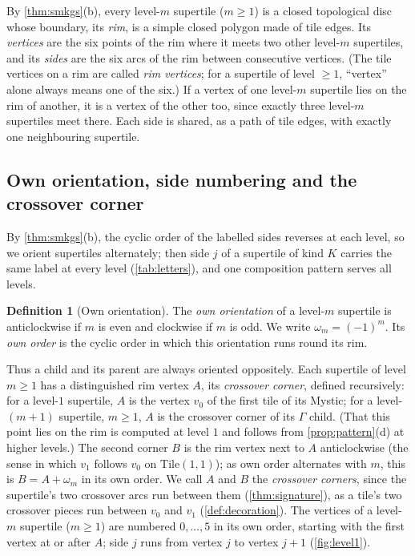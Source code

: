 \documentclass[11pt]{amsart}
\theoremstyle{definition}
\newtheorem{definition}[theorem]{Definition}
\theoremstyle{remark}
\newcommand{\Tile}{\mathrm{Tile}(1,1)}
\begin{document}
By \cref{thm:smkgs}(b), every level-$m$ supertile ($m\ge1$) is a closed topological disc whose boundary, its \emph{rim}, is a
simple closed polygon made of tile edges. Its \emph{vertices} are the six points of the rim where it meets two other
level-$m$ supertiles, and its \emph{sides} are the six arcs of the rim between consecutive vertices. (The tile
vertices on a rim are called \emph{rim vertices}; for a supertile of level $\ge1$, ``vertex'' alone always means one of
the six.) If a vertex of one level-$m$ supertile lies on the rim of another, it is a vertex of the other too, since
exactly three level-$m$ supertiles meet there. Each side is shared, as a path of tile edges, with exactly one
neighbouring supertile.

\subsection{Own orientation, side numbering and the crossover corner}\label{sec:own}
By \cref{thm:smkgs}(b), the cyclic order of the labelled sides reverses at each level, so we orient supertiles
alternately; then side $j$ of a supertile of kind $K$ carries the same label at every level (\cref{tab:letters}), and
one composition pattern serves all levels.

\begin{definition}[Own orientation]\label{def:own}
The \emph{own orientation} of a level-$m$ supertile is anticlockwise if $m$ is even and clockwise if $m$ is odd.
We write $\omega_m=(-1)^m$. Its \emph{own order} is the cyclic order in which this orientation runs round its rim.
\end{definition}

Thus a child and its parent are always oriented oppositely. Each supertile of level $m\ge1$ has a distinguished rim
vertex $A$, its \emph{crossover corner}, defined recursively: for a level-$1$ supertile, $A$ is the vertex $v_0$ of the
first tile of its Mystic; for a level-$(m+1)$ supertile, $m\ge1$, $A$ is the crossover corner of its $\Gamma$ child.
(That this point lies on the rim is computed at level $1$ and follows from \cref{prop:pattern}(d) at higher levels.)
The second corner $B$ is the rim vertex next to $A$ anticlockwise (the sense in which $v_1$ follows $v_0$ on
$\Tile$); as own order alternates with $m$, this is $B=A+\omega_m$ in its own order. We call $A$ and $B$ the
\emph{crossover corners}, since the supertile's two crossover arcs run between them (\cref{thm:signature}), as a tile's
two crossover pieces run between $v_0$ and $v_1$ (\cref{def:decoration}). The vertices of a level-$m$ supertile
($m\ge1$) are numbered $0,\dots,5$ in its own order, starting with the first vertex at or after $A$; side $j$ runs from
vertex $j$ to vertex $j+1$ (\cref{fig:level1}).
\end{document}
